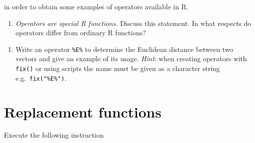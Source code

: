 \documentclass[
]{book}
\providecommand{\tightlist}{%
  \setlength{\itemsep}{0pt}\setlength{\parskip}{0pt}}
\begin{document}
in order to obtain some examples of operators available in R.

\begin{enumerate}
\def\labelenumi{(\alph{enumi})}
\tightlist
\item
  \emph{{Operators are special R functions.}} Discuss this statement. In what respects do operators differ from ordinary R functions?
\end{enumerate}

\begin{enumerate}
\def\labelenumi{(\alph{enumi})}
\setcounter{enumi}{1}
\tightlist
\item
  Write an operator \texttt{\%E\%} to determine the Euclidean distance between two vectors and give an example of its usage. \emph{Hint}: when creating operators with \texttt{fix()} or using scripts the name must be given as a character string e.g.~\texttt{fix("\%E\%")}.
\end{enumerate}

\section{Replacement functions}\label{replacement-functions}

Execute the following instruction
\end{document}
